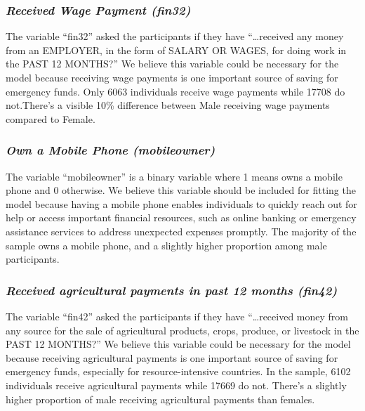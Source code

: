 \documentclass[12pt]{article}
\begin{document}
\hypertarget{received-wage-payment-fin32}{%
\subsubsection{\texorpdfstring{\emph{Received Wage Payment
(fin32)}}{Received Wage Payment (fin32)}}\label{received-wage-payment-fin32}}

The variable ``fin32'' asked the participants if they have
``\ldots received any money from an EMPLOYER, in the form of SALARY OR
WAGES, for doing work in the PAST 12 MONTHS?'' We believe this variable
could be necessary for the model because receiving wage payments is one
important source of saving for emergency funds. Only 6063 individuals
receive wage payments while 17708 do not.There's a visible 10\%
difference between Male receiving wage payments compared to Female.

\hypertarget{own-a-mobile-phone-mobileowner}{%
\subsubsection{\texorpdfstring{\emph{Own a Mobile Phone
(mobileowner)}}{Own a Mobile Phone (mobileowner)}}\label{own-a-mobile-phone-mobileowner}}

The variable ``mobileowner'' is a binary variable where 1 means owns a
mobile phone and 0 otherwise. We believe this variable should be
included for fitting the model because having a mobile phone enables
individuals to quickly reach out for help or access important financial
resources, such as online banking or emergency assistance services to
address unexpected expenses promptly. The majority of the sample owns a
mobile phone, and a slightly higher proportion among male participants.

\hypertarget{received-agricultural-payments-in-past-12-months-fin42}{%
\subsubsection{\texorpdfstring{\emph{Received agricultural payments in
past 12 months
(fin42)}}{Received agricultural payments in past 12 months (fin42)}}\label{received-agricultural-payments-in-past-12-months-fin42}}

The variable ``fin42'' asked the participants if they have
``\ldots received money from any source for the sale of agricultural
products, crops, produce, or livestock in the PAST 12 MONTHS?'' We
believe this variable could be necessary for the model because receiving
agricultural payments is one important source of saving for emergency
funds, especially for resource-intensive countries. In the sample, 6102
individuals receive agricultural payments while 17669 do not. There's a
slightly higher proportion of male receiving agricultural payments than
females.
\end{document}
